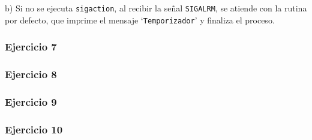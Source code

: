 \documentclass{article}
\begin{document}
b) Si no se ejecuta \texttt{sigaction}, al recibir la señal \texttt{SIGALRM}, se atiende con la rutina por defecto, que imprime el mensaje `\texttt{Temporizador}' y finaliza el proceso.

\subsubsection*{Ejercicio 7}

\subsubsection*{Ejercicio 8}

\subsubsection*{Ejercicio 9}

\subsubsection*{Ejercicio 10}
\end{document}
